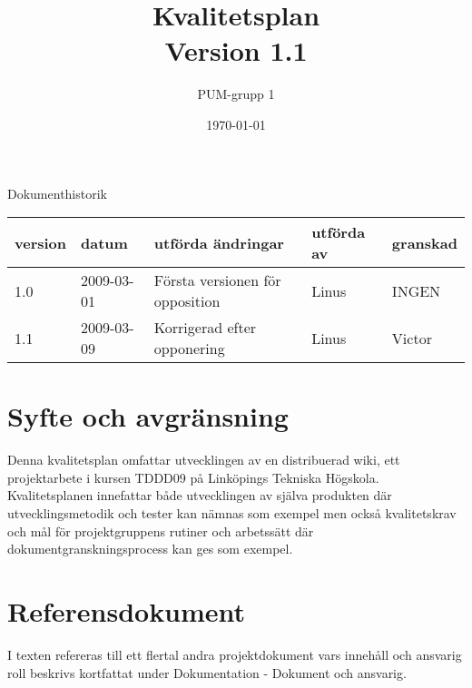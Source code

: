 

\ifpdf
\else
\fi

\title{Kvalitetsplan\\ Version 1.1}
\author{PUM-grupp 1}
\date{\today}



\maketitle\thispagestyle{empty}
\newpage

{\centering \Large{Dokumenthistorik\\}}

\vspace{10pt}
\begin{tabularx}{\textwidth}{ |l|l|X|l|l| }
  \hline
    \textbf{version} & \textbf{datum} & \textbf{utförda ändringar} & \textbf{utförda av} & \textbf{granskad} \\
	\hline 
  1.0 & 2009-03-01 & Första versionen för opposition & Linus & INGEN \\
  1.1 & 2009-03-09 & Korrigerad efter opponering & Linus & Victor \\
  \hline
\end{tabularx}

\newpage

\setcounter{tocdepth}{3}
\tableofcontents
\newpage

\section{Syfte och avgränsning}
Denna kvalitetsplan omfattar utvecklingen av en distribuerad wiki, ett projektarbete i kursen TDDD09 på Linköpings Tekniska Högskola. Kvalitetsplanen innefattar både utvecklingen av själva produkten där utvecklingsmetodik och tester kan nämnas som exempel men också kvalitetskrav och mål för projektgruppens rutiner och arbetssätt där dokumentgranskningsprocess kan ges som exempel. 

\section{Referensdokument}
I texten refereras till ett flertal andra projektdokument vars innehåll och ansvarig roll beskrivs kortfattat under Dokumentation - Dokument och ansvarig.

